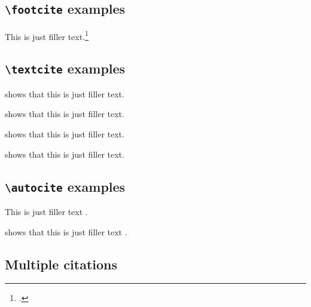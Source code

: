 \documentclass[a4paper]{article}
\newcommand{\cmd}[1]{\texttt{\textbackslash #1}}
\begin{document}
\subsection*{\cmd{footcite} examples}

This is just filler text.\footcite{aristotle:rhetoric}

\subsection*{\cmd{textcite} examples}

\textcite{aristotle:rhetoric} shows that this is just filler text.

\textcite[59]{aristotle:rhetoric} shows that this is just filler text.

\textcite[see][]{aristotle:rhetoric} shows that this is just filler text.

\textcite[see][59--63]{aristotle:rhetoric} shows that this is just filler text.

\subsection*{\cmd{autocite} examples}


This is just filler text \autocite{aristotle:rhetoric}.

\citeauthor{aristotle:rhetoric} shows that this is just filler
text \autocite*{aristotle:rhetoric}.

\subsection*{Multiple citations}


\cite{aristotle:rhetoric,averroes/bland,aristotle:physics,aristotle:poetics}

\clearpage
\printbibliography
\end{document}

